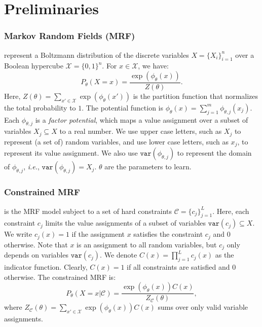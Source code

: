 \documentclass[letterpaper]{article} %
\newcommand{\var}{\mathtt{var}}
\begin{document}
\section{Preliminaries} \label{sec:prelim}
\subsubsection{Markov Random Fields (MRF)} represent a Boltzmann distribution of the discrete variables  $X=\{X_i\}_{i=1}^n$ over a Boolean hypercube 
 $\mathcal{X}=\{0, 1\}^n$. For $x\in\mathcal{X}$, we have:
\begin{equation} \label{eq:mrf}
P_{\theta}(X=x)=\frac{\exp \left(\phi_\theta(x)\right)}{Z(\theta)}.%
\end{equation}
Here,
$Z(\theta)=\sum_{x'\in \mathcal{X}} \exp\left(\phi_\theta(x')\right)$ is the partition function that normalizes the total probability to $1$. {The potential function is} $\phi_\theta(x)=\sum_{j=1}^m \phi_{\theta,j}(x_{j})$. 
%
Each $\phi_{\theta,j}$ is a \textit{factor potential}, which maps a value assignment over a subset of variables $X_j \subseteq X$ to a real number. 
%
We use upper case letters, such as $X_j$ to represent (a set of) random variables, and use lower case letters, such as $x_j$, to represent its value assignment. 
%
We also use $\var(\phi_{\theta, j})$ to represent the domain of $\phi_{\theta, j}$, \textit{i.e.}, $\var(\phi_{\theta, j}) = X_j$.
%
$\theta$ are the parameters to learn.

\subsubsection{Constrained MRF} is the MRF model subject to
a set of hard constraints $\mathcal{C}=\{c_j\}_{j=1}^L$.
%
Here, each constraint $c_j$ limits the value assignments of a subset of variables $\var(c_j) \subseteq X$.
%
We write $c_j(x) = 1$ if the assignment $x$  satisfies the constraint $c_j$ and $0$ otherwise. Note that $x$ is an assignment to all random variables, but $c_j$ only depends on variables  $\var(c_j)$.
%
%
We denote $C(x) = \prod_{j=1}^L c_j(x)$ as the indicator function. Clearly, $C(x) = 1$ if all constraints are satisfied and $0$ otherwise. 
%
The constrained MRF is:
\begin{equation} \label{eq:constr_mrf}
P_{\theta}(X=x|\mathcal{C})=\frac{\exp \left(\phi_\theta(x)\right)C(x)}{Z_\mathcal{C}(\theta)},
\end{equation}
where $Z_\mathcal{C}(\theta)={\sum}_{x'\in \mathcal{X}} \exp\left(\phi_\theta(x)\right) C(x)$ sums over only valid variable assignments. 
\end{document}
